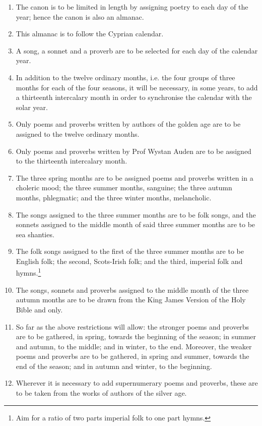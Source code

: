 \begin{enumerate}[leftmargin=*, resume]
    \item{The canon is to be limited in length by assigning poetry to each day of the year; hence the canon is also an almanac.}
    \item{This almanac is to follow the Cyprian calendar.}
    \item{A song, a sonnet and a proverb are to be selected for each day of the calendar year.}
    \item{In addition to the twelve ordinary months, i.e. the four groups of three months for each of the four seasons, it will be necessary, in some years, to add a thirteenth intercalary month in order to synchronise the calendar with the solar year.}
    \item{Only poems and proverbs written by authors of the golden age are to be assigned to the twelve ordinary months.}
    \item{Only poems and proverbs written by Prof Wystan Auden are to be assigned to the thirteenth intercalary month.}
    \item{The three spring months are to be assigned poems and proverbs written in a choleric mood; the three summer months, sanguine; the three autumn months, phlegmatic; and the three winter months, melancholic.}
    \item{The songs assigned to the three summer months are to be folk songs, and the sonnets assigned to the middle month of said three summer months are to be sea shanties.}
    \item{The folk songs assigned to the first of the three summer months are to be English folk; the second, Scots-Irish folk; and the third, imperial folk and hymns.\footnote{Aim for a ratio of two parts imperial folk to one part hymns.}}
    \item{The songs, sonnets and proverbs assigned to the middle month of the three autumn months are to be drawn from the King James Version of the Holy Bible and  only.}
    \item{So far as the above restrictions will allow: the stronger poems and proverbs are to be gathered, in spring, towards the beginning of the season; in summer and autumn, to the middle; and in winter, to the end. Moreover, the weaker poems and proverbs are to be gathered, in spring and summer, towards the end of the season; and in autumn and winter, to the beginning.}
    \item{Wherever it is necessary to add supernumerary poems and proverbs, these are to be taken from the works of authors of the silver age.}
\end{enumerate}

